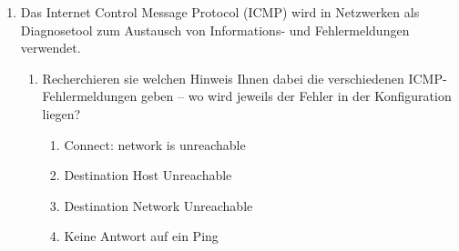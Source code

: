 \documentclass[paper=a4,fontsize=11pt]{scrartcl}%
\numberwithin{equation}{section}
\begin{document}
\begin{enumerate}
	\begin{enumerate}
	\item Recherchieren sie mit den vorangegangen Quellen, was ein Routing-Table/Routing-Tabelle ist \footnote{\url{https://docs.freebsd.org/doc/12.1-RELEASE/usr/local/share/doc/freebsd/de_DE.ISO8859-1/books/handbook/network-routing.html}}.
	\item Recherchieren sie den Unterschied zwischen Forwarding und Routing.
	\item Wie aktivieren sie unter \emph{freeBSD} das Forwarding? Analog: Wie wird  das Forwarding unter Linux (Arch-Linux) eingeschaltet?
	\item In welcher Konfigurationsdatei müssen sie einen Eintrag vornehmen, so das das Routing dauerhaft beim Systemstart aktiviert bleibt? Notieren sie sich beispielhaft (auszugsweise) wie dies aussehen kann.
	\end{enumerate}
	\item Das Internet Control Message Protocol (ICMP) wird in Netzwerken als Diagnosetool zum Austausch von Informations- und Fehlermeldungen verwendet. 
	\begin{enumerate}
		\item Recherchieren sie welchen Hinweis Ihnen dabei die verschiedenen ICMP-Fehlermeldungen geben -- wo wird jeweils der Fehler in der Konfiguration liegen?
		\begin{enumerate}
			\item Connect: network is unreachable
			\item Destination Host Unreachable
			\item Destination Network Unreachable
			\item Keine Antwort auf ein Ping
		\end{enumerate}  
	\end{enumerate}
\end{enumerate}
\end{document}
